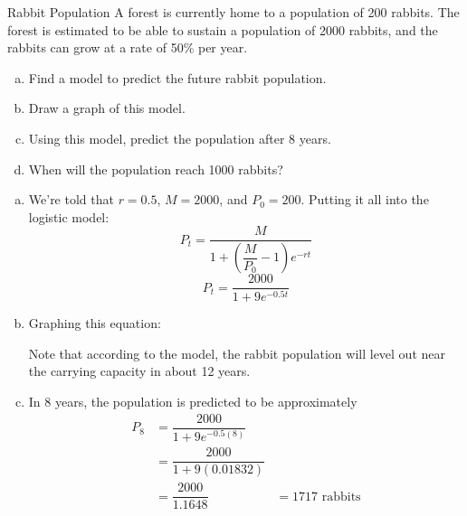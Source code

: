 \begin{example}[https://www.youtube.com/watch?v=mmL2H7_ynUA&list=PLfmpjsIzhztutjEb8Pg5OBOlI1p80yVoy&index=14]{Rabbit Population}
A forest is currently home to a population of 200 rabbits.  The forest is estimated to be able to sustain a population of 2000 rabbits, and the rabbits can grow at a rate of 50\% per year.
\begin{enumerate}[(a)]
\item Find a model to predict the future rabbit population.
\item Draw a graph of this model.
\item Using this model, predict the population after 8 years.
\item When will the population reach 1000 rabbits?
\end{enumerate}

\sol
\begin{enumerate}[(a)]
\item We're told that $r=0.5$, $M=2000$, and $P_0=200$.  Putting it all into the logistic model:
\[P_t = \dfrac{M}{1+\left(\dfrac{M}{P_0}-1\right)e^{-rt}}\]
\[\boxed{P_t = \dfrac{2000}{1+9e^{-0.5t}}}\]

\item Graphing this equation:
\begin{center}
\end{center}
Note that according to the model, the rabbit population will level out near the carrying capacity in about 12 years.

\item In 8 years, the population is predicted to be approximately
\begin{align*}
P_8 &= \dfrac{2000}{1+9e^{-0.5(8)}}\\
&= \dfrac{2000}{1+9(0.01832)}\\
&= \dfrac{2000}{1.1648}
&= \boxed{1717 \textrm{ rabbits}}
\end{align*}


\end{enumerate}
\end{example}
